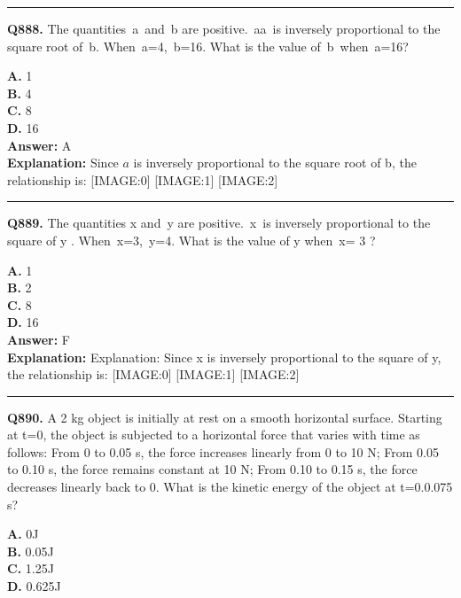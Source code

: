 \documentclass[12pt]{article}
\begin{document}
\hrule
\vspace{1em}


\noindent
\textbf{Q888.} The quantities a and b are positive. aa is inversely proportional to the square root of b. When a=4, b=16. What is the value of b when a=16?



\textbf{A.} 1 \\
\textbf{B.} 4 \\
\textbf{C.} 8 \\
\textbf{D.} 16 \\

\textbf{Answer:} A \\
\textbf{Explanation:} Since
$𝑎$
is inversely proportional to the square root of b, the relationship is:
[IMAGE:0]
[IMAGE:1]
[IMAGE:2]

\hrule
\vspace{1em}


\noindent
\textbf{Q889.} The quantities
x
and y
are positive. x is inversely proportional to the square of
y
. When x=3, y=4. What is the value of
y
when x=
3
?



\textbf{A.} 1 \\
\textbf{B.} 2 \\
\textbf{C.} 8 \\
\textbf{D.} 16 \\

\textbf{Answer:} F \\
\textbf{Explanation:} Explanation: Since x is inversely proportional to the square of y, the relationship is:
[IMAGE:0]
[IMAGE:1]
[IMAGE:2]

\hrule
\vspace{1em}


\noindent
\textbf{Q890.} A 2 kg object is initially at rest on a smooth horizontal surface. Starting at t=0, the object is subjected to a horizontal force that varies with time as follows:
From 0 to 0.05 s, the force increases linearly from 0 to 10 N;
From 0.05 to 0.10 s, the force remains constant at 10 N;
From 0.10 to 0.15 s, the force decreases linearly back to 0.
What is the kinetic energy of the object at t=0.0.075 s?



\textbf{A.} 0J \\
\textbf{B.} 0.05J \\
\textbf{C.} 1.25J \\
\textbf{D.} 0.625J \\
\end{document}
